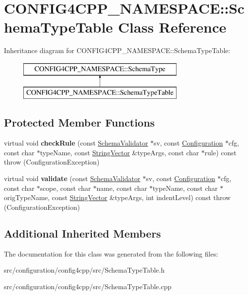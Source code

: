 \hypertarget{classCONFIG4CPP__NAMESPACE_1_1SchemaTypeTable}{\section{C\-O\-N\-F\-I\-G4\-C\-P\-P\-\_\-\-N\-A\-M\-E\-S\-P\-A\-C\-E\-:\-:Schema\-Type\-Table Class Reference}
\label{classCONFIG4CPP__NAMESPACE_1_1SchemaTypeTable}
}
Inheritance diagram for C\-O\-N\-F\-I\-G4\-C\-P\-P\-\_\-\-N\-A\-M\-E\-S\-P\-A\-C\-E\-:\-:Schema\-Type\-Table\-:\begin{figure}[H]
\begin{center}
\leavevmode
\includegraphics[height=2.000000cm]{classCONFIG4CPP__NAMESPACE_1_1SchemaTypeTable}
\end{center}
\end{figure}
\subsection*{Protected Member Functions}
\begin{DoxyCompactItemize}
\item 
\hypertarget{classCONFIG4CPP__NAMESPACE_1_1SchemaTypeTable_ae744a5ee7f922d5c90b2ddf184f35702}{virtual void {\bfseries check\-Rule} (const \hyperlink{classCONFIG4CPP__NAMESPACE_1_1SchemaValidator}{Schema\-Validator} $\ast$sv, const \hyperlink{classCONFIG4CPP__NAMESPACE_1_1Configuration}{Configuration} $\ast$cfg, const char $\ast$type\-Name, const \hyperlink{classCONFIG4CPP__NAMESPACE_1_1StringVector}{String\-Vector} \&type\-Args, const char $\ast$rule) const   throw (\-Configuration\-Exception)}\label{classCONFIG4CPP__NAMESPACE_1_1SchemaTypeTable_ae744a5ee7f922d5c90b2ddf184f35702}

\item 
\hypertarget{classCONFIG4CPP__NAMESPACE_1_1SchemaTypeTable_a8dddf91ab9ea69358a217da74f0c0b9c}{virtual void {\bfseries validate} (const \hyperlink{classCONFIG4CPP__NAMESPACE_1_1SchemaValidator}{Schema\-Validator} $\ast$sv, const \hyperlink{classCONFIG4CPP__NAMESPACE_1_1Configuration}{Configuration} $\ast$cfg, const char $\ast$scope, const char $\ast$name, const char $\ast$type\-Name, const char $\ast$orig\-Type\-Name, const \hyperlink{classCONFIG4CPP__NAMESPACE_1_1StringVector}{String\-Vector} \&type\-Args, int indent\-Level) const   throw (\-Configuration\-Exception)}\label{classCONFIG4CPP__NAMESPACE_1_1SchemaTypeTable_a8dddf91ab9ea69358a217da74f0c0b9c}

\end{DoxyCompactItemize}
\subsection*{Additional Inherited Members}


The documentation for this class was generated from the following files\-:\begin{DoxyCompactItemize}
\item 
src/configuration/config4cpp/src/Schema\-Type\-Table.\-h\item 
src/configuration/config4cpp/src/Schema\-Type\-Table.\-cpp\end{DoxyCompactItemize}
